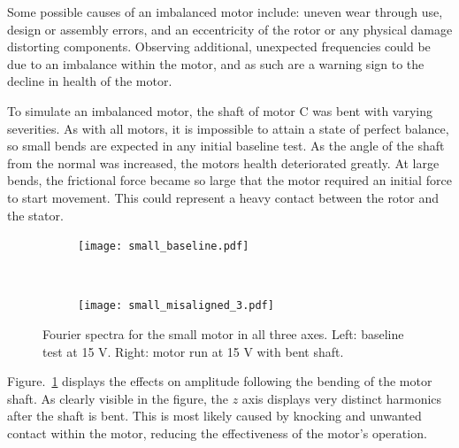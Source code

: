 Some possible causes of an imbalanced motor include: uneven wear through use, design or assembly errors, and an eccentricity of the rotor or any physical damage distorting components. Observing additional, unexpected frequencies could be due to an imbalance within the motor, and as such are a warning sign to the decline in health of the motor. 


To simulate an imbalanced motor, the shaft of motor C was bent with varying severities. 
As with all motors, it is impossible to attain a state of perfect balance, so small bends are expected in any initial baseline test. As the angle of the shaft from the normal was increased, the motors health deteriorated greatly. At large bends, the frictional force became so large that the motor required an initial force to start movement. This could represent a heavy contact between the rotor and the stator. 

\begin{figure}[t!]
    \centering
    \begin{subfigure}[t]{0.5\textwidth}
        \centering
        \texttt{[image: small\_baseline.pdf]}
    \end{subfigure}%
    ~ 
    \begin{subfigure}[t]{0.5\textwidth}
        \centering
        \texttt{[image: small\_misaligned\_3.pdf]}
    \end{subfigure}
    \caption[Fourier Plot Misaligned Shaft]{Fourier spectra for the small motor in all three axes. Left: baseline test at 15 V. Right: motor run at 15 V with bent shaft.}
    \label{fig:bent_shaft_fourier}
\end{figure}

Figure.~\ref{fig:bent_shaft_fourier} displays the effects on amplitude following the bending of the motor shaft. As clearly visible in the figure, the $z$ axis displays very distinct harmonics after the shaft is bent. This is most likely caused by knocking and unwanted contact within the motor, reducing the effectiveness of the motor's operation.


